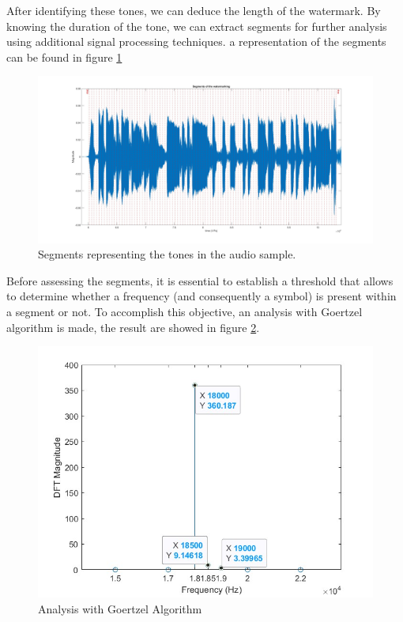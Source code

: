 After identifying these tones, we can deduce the length of the watermark. By knowing the duration of the tone, we can extract segments for further analysis using additional signal processing techniques. a representation of the segments can be found in figure \ref{fig:segments}
\begin{figure}[H]
    \centering
    \includegraphics[width=\textwidth]{LiveAudioWatermarking/images/sgments.jpg}
    \caption{Segments representing the tones in the audio sample.}
    \label{fig:segments}
\end{figure}

Before assessing the segments, it is essential to establish a threshold that allows to determine whether a frequency (and consequently a symbol) is present within a segment or not. 
To accomplish this objective, an analysis with Goertzel algorithm is made, the result are showed in figure \ref{fig:goertzel}. 
\begin{figure}[H]
    \centering
    \includegraphics[width=0.8\linewidth]{LiveAudioWatermarking/images/Goertzel-full.jpg}
    \caption{Analysis with Goertzel Algorithm}
    \label{fig:goertzel}
\end{figure}


